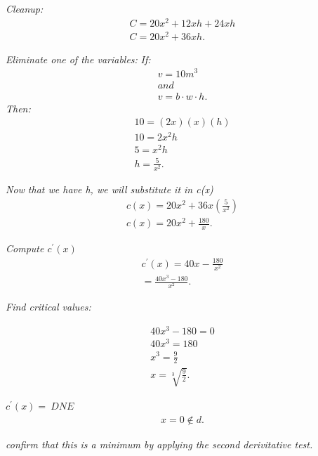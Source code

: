 \documentclass{report}
\begin{document}
 \bigbreak \noindent 
 \textit{Cleanup:} 
 \begin{align*}
   C = 20x^{2} + 12xh + 24xh \\
   C = 20x^{2} + 36xh
 .\end{align*}

 \bigbreak \noindent 
 \textit{Eliminate one of the variables:}
 \bigbreak \noindent 
 \textit{If:}
 \begin{align*}
   v=10m^{3} \\
   and\\
   v = b \cdot w \cdot h
 .\end{align*}
 \bigbreak \noindent 
 \textit{Then:}
 \begin{align*}
   10 = (2x)(x)(h) \\
   10 = 2x^{2}h \\
   5 = x^{2}h \\
   h = \frac{5}{x^{2}}
 .\end{align*}

 \bigbreak \noindent 
 \textit{Now that we have h, we will substitute it in c(x)}
 \begin{align*}
   c(x) = 20x^{2}+36x(\frac{5}{x^{2}}) \\
   c(x) = 20x^{2} + \frac{180}{x}
 .\end{align*}

 \bigbreak \noindent 
 \textit{Compute $c^{\prime}(x)$}
 \begin{align*}
   c^{\prime}(x) = 40x - \frac{180}{x^{2}} \\
   = \frac{40x^{3}-180}{x^{2}}
 .\end{align*}

 \bigbreak \noindent 
 \textit{Find critical values:}

 \begin{align*}
   40x^{3} -180 = 0  \\
   40x^{3} = 180 \\
   x^{3} = \frac{9}{2} \\
   x = \sqrt[3]{\frac{9}{2}}
 .\end{align*}

 \bigbreak \noindent 
 \textit{$c^{\prime}(x) =\ DNE $}
 \begin{align*}
   x = 0 \notin d
 .\end{align*}
 \bigbreak \noindent 

 \bigbreak \noindent 
 \textit{confirm that this is a minimum by applying the second derivitative test.}
\end{document}
